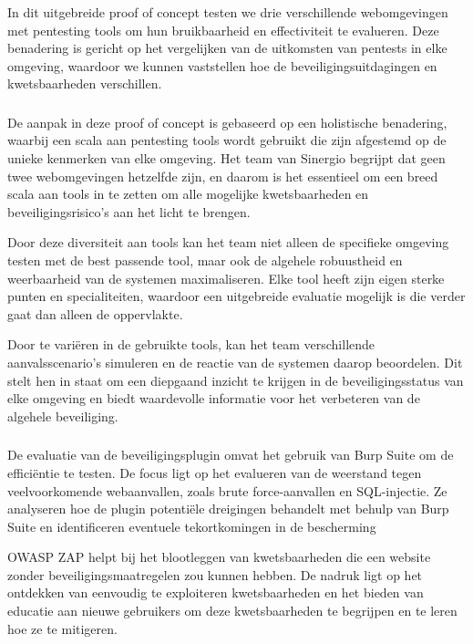 In dit uitgebreide proof of concept testen we drie verschillende webomgevingen met pentesting tools om hun bruikbaarheid en effectiviteit te evalueren. 
Deze benadering is gericht op het vergelijken van de uitkomsten van pentests in elke omgeving, waardoor we kunnen vaststellen hoe de 
beveiligingsuitdagingen en kwetsbaarheden verschillen.

\subsubsection{}
De aanpak in deze proof of concept is gebaseerd op een holistische benadering, waarbij een scala aan pentesting tools wordt gebruikt die zijn afgestemd 
op de unieke kenmerken van elke omgeving. Het team van Sinergio begrijpt dat geen twee webomgevingen hetzelfde zijn, en daarom is het essentieel om een breed scala 
aan tools in te zetten om alle mogelijke kwetsbaarheden en beveiligingsrisico's aan het licht te brengen.

Door deze diversiteit aan tools kan het team niet alleen de specifieke omgeving testen met de best passende tool, maar ook de algehele robuustheid en 
weerbaarheid van de systemen maximaliseren. Elke tool heeft zijn eigen sterke punten en specialiteiten, waardoor een uitgebreide evaluatie mogelijk 
is die verder gaat dan alleen de oppervlakte.

Door te variëren in de gebruikte tools, kan het team verschillende aanvalsscenario's simuleren en de reactie van de systemen daarop beoordelen. Dit 
stelt hen in staat om een diepgaand inzicht te krijgen in de beveiligingsstatus van elke omgeving en biedt waardevolle informatie voor het verbeteren 
van de algehele beveiliging.

\subsubsection{}
De evaluatie van de beveiligingsplugin omvat het gebruik van Burp Suite om de efficiëntie te testen. De focus ligt op het evalueren van de weerstand 
tegen veelvoorkomende webaanvallen, zoals brute force-aanvallen en SQL-injectie. Ze analyseren hoe de plugin potentiële dreigingen behandelt met 
behulp van Burp Suite en identificeren eventuele tekortkomingen in de bescherming

OWASP ZAP helpt bij het blootleggen van kwetsbaarheden die een website zonder beveiligingsmaatregelen zou kunnen hebben. De nadruk ligt op het 
ontdekken van eenvoudig te exploiteren kwetsbaarheden en het bieden van educatie aan nieuwe gebruikers om deze kwetsbaarheden te begrijpen en 
te leren hoe ze te mitigeren.

